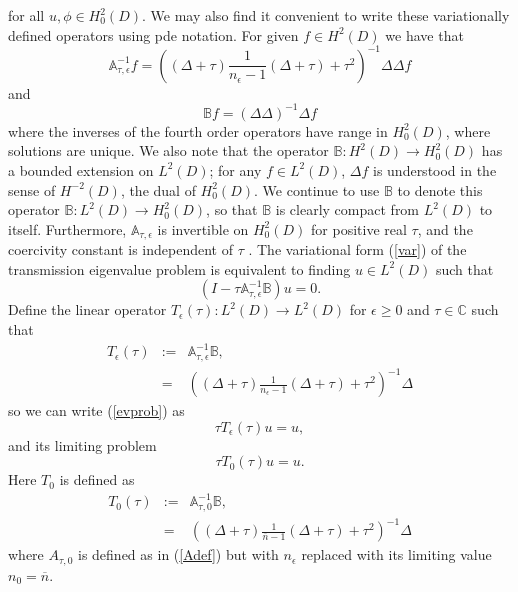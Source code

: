 \documentclass[12pt]{article}
\begin{document}
for all $u,\phi\in H^2_0(D)$. We may also find it convenient to write these variationally defined operators using pde notation. For given $f\in H^2(D)$ we have that 
$$ \mathbb{A}_{\tau,\epsilon}^{-1} f  = \left( (\Delta +\tau ) \frac{1}{n_\epsilon-1} (\Delta +\tau ) +\tau^2 \right)^{-1}\Delta\Delta f $$
and 
$$ \mathbb{B}f = (\Delta\Delta)^{-1}\Delta f $$
where the inverses of the fourth order operators have range in $H^2_0(D)$, where solutions are unique. We also note that the operator $\mathbb{B}: H^2( D)\rightarrow H^2_0( D)$ has a bounded extension on $L^2( D)$; for any $f\in L^2( D)$, $\Delta f$ is understood in the sense of $H^{-2}(D)$, the dual of $H^2_0(D)$. We continue to use $\mathbb{B}$ to denote this operator $\mathbb{B}:L^2( D)\rightarrow H^2_0( D)$, so that $\mathbb{B}$ is clearly compact from $L^2( D)$ to itself. Furthermore, $\mathbb{A}_{\tau,\epsilon}$ is invertible on $H^2_0(D)$ for positive real $\tau$, and the coercivity constant is independent of $\tau$  \cite{CaHa}. 
The variational form (\ref{var}) of the transmission eigenvalue problem is equivalent to finding $u\in L^2(D)$ such that
\begin{equation}\label{evprob}
(I-\tau \mathbb{A}_{\tau,\epsilon}^{-1}\mathbb{B})u=0.
\end{equation}
Define the linear operator $T_\epsilon(\tau): L^2(D)\to L^2(D)$ for $\epsilon\geq 0$ and $\tau\in \mathbb{C}$ such that
\begin{eqnarray}\label{Te}
 T_\epsilon (\tau) &:= & \mathbb{A}_{\tau,\epsilon}^{-1} \mathbb{B}, \\ 
& = &\left( (\Delta +\tau ) \frac{1}{n_\epsilon-1} (\Delta +\tau ) +\tau^2 \right)^{-1}\Delta  \nonumber
 \end{eqnarray}
so we can write (\ref{evprob}) as
 \begin{equation} \label{TEepsilon}
 \tau T_\epsilon (\tau) u = u,
 \end{equation}
 and its limiting problem
 \begin{equation} \label{TE0}
 \tau T_0 (\tau) u = u.
 \end{equation}
 Here $T_0 $ is defined as 
 \begin{eqnarray}\label{T0}
 T_0 (\tau) &:=&  \mathbb{A}_{\tau,0}^{-1} \mathbb{B}, \\
 & = &\left( (\Delta +\tau ) \frac{1}{\overline{n}-1} (\Delta +\tau ) +\tau^2 \right)^{-1}\Delta  \nonumber
 \end{eqnarray}
 where $A_{\tau,0}$ is defined as in (\ref{Adef}) but with $n_\epsilon$ replaced with its limiting value $n_0=\overline{n}$. 
\end{document}
